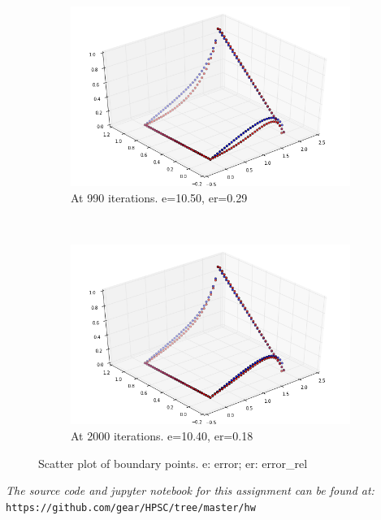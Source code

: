 \documentclass[a4paper,12pt]{article}
\begin{document}
\begin{figure}[h!]
  \centering
  \begin{subfigure}[b]{0.48\textwidth}
    \includegraphics[width=\textwidth]{hpsc_a1_scat_990.png}
    \caption{At 990 iterations. e=10.50, er=0.29}
  \end{subfigure}
~
\begin{subfigure}[b]{0.48\textwidth}
    \includegraphics[width=\textwidth]{hpsc_a1_scat_2000.png}
    \caption{At 2000 iterations. e=10.40, er=0.18}
  \end{subfigure}
  \caption{Scatter plot of boundary points. e: error; er: error\_rel}
\end{figure}
\vfill
\noindent
\emph{The source code and jupyter notebook for this assignment can be found at:} \\
\texttt{https://github.com/gear/HPSC/tree/master/hw}
\end{document}
